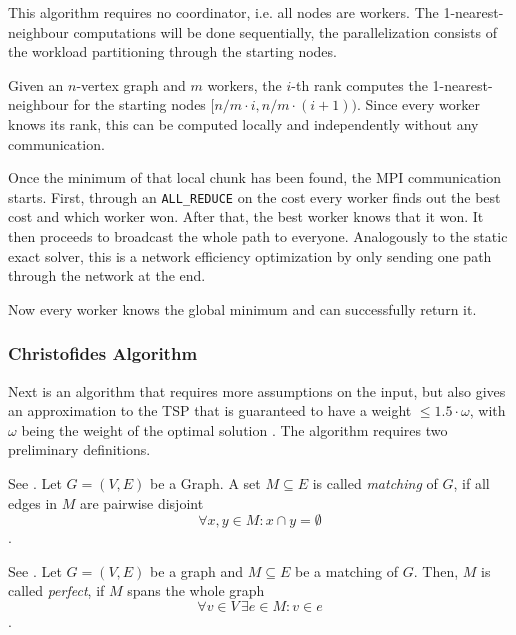 This algorithm requires no coordinator, i.e. all nodes are workers. The 1-nearest-neighbour computations will be done sequentially, the parallelization consists of the workload partitioning through the starting nodes.

Given an $n$-vertex graph and $m$ workers, the $i$-th rank computes the 1-nearest-neighbour for the starting nodes $[n/m\cdot i, n/m \cdot (i+1))$. Since every worker knows its rank, this can be computed locally and independently without any communication.

Once the minimum of that local chunk has been found, the \acs{MPI} communication starts. First, through an \texttt{ALL\_REDUCE} on the cost every worker finds out the best cost and which worker won. After that, the best worker knows that it won. It then proceeds to broadcast the whole path to everyone. Analogously to the static exact solver, this is a network efficiency optimization by only sending one path through the network at the end.

Now every worker knows the global minimum and can successfully return it.

\subsubsection{Christofides Algorithm}

Next is an algorithm that requires more assumptions on the input,
but also gives an approximation to the TSP that is guaranteed to have
a weight $\leq 1.5 \cdot \omega$, with $\omega$ being the weight of the optimal solution
\cite{christofides_worst-case_1976}.
The algorithm requires two preliminary definitions.

\begin{definition}[Matching]
  See \cite{weisstein_matching_nodate}.
  Let $G = (V, E)$ be a Graph.
  A set $M \subseteq E$ is called \emph{matching} of $G$, if
  all edges in $M$ are pairwise disjoint
  $$ \forall x,y \in M: x \cap y = \emptyset $$.
  \label{def:matching}
\end{definition}

\begin{definition}
  See \cite{weisstein_matching_nodate}.
  Let $G = (V, E)$ be a graph and $M \subseteq E$ be a matching of $G$.
  Then, $M$ is called \emph{perfect}, if $M$ spans the whole graph
  $$ \forall v \in V \, \exists e \in M: v \in e $$.
  \label{def:perfect_matching}
\end{definition}

